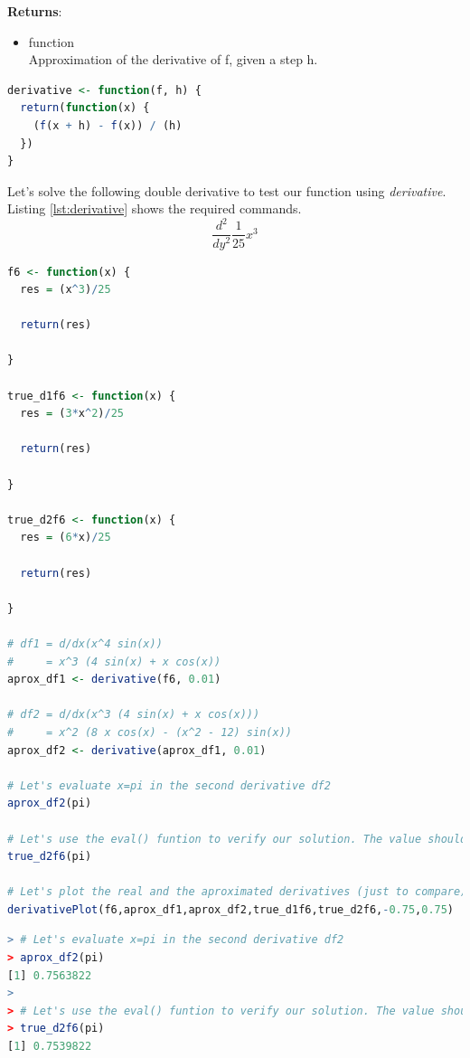 \documentclass[11pt,a4paper]{article}
\begin{document}
\textbf{Returns}:
\begin{itemize}
  \item {function\\
Approximation of the derivative of f, given a step h.}
\end{itemize}

\clearpage

\begin{lstlisting}[frame=trBL, language=R, caption="The \emph{derivative} function"
\label{lst:derivativeFunct}]
derivative <- function(f, h) {
  return(function(x) {
    (f(x + h) - f(x)) / (h)
  })
}
\end{lstlisting}

Let's solve the following double derivative to test our function using \emph{derivative}. Listing \ref{lst:derivative} shows the required commands.
$$ \frac{d^2}{d y^2} \frac{1}{25} x^3 $$

\begin{lstlisting}[frame=trBL, language=R, caption="Define the function and implement \emph{derivative}"
\label{lst:derivative}]
f6 <- function(x) {
  res = (x^3)/25
  
  return(res)
  
}

true_d1f6 <- function(x) {
  res = (3*x^2)/25
  
  return(res)
  
}

true_d2f6 <- function(x) {
  res = (6*x)/25
  
  return(res)
  
}

# df1 = d/dx(x^4 sin(x))
#     = x^3 (4 sin(x) + x cos(x))
aprox_df1 <- derivative(f6, 0.01)

# df2 = d/dx(x^3 (4 sin(x) + x cos(x)))
#     = x^2 (8 x cos(x) - (x^2 - 12) sin(x))
aprox_df2 <- derivative(aprox_df1, 0.01)

# Let's evaluate x=pi in the second derivative df2
aprox_df2(pi)

# Let's use the eval() funtion to verify our solution. The value should be around df2(pi)
true_d2f6(pi)

# Let's plot the real and the aproximated derivatives (just to compare)
derivativePlot(f6,aprox_df1,aprox_df2,true_d1f6,true_d2f6,-0.75,0.75)
\end{lstlisting}

\clearpage

\begin{lstlisting}[frame=trBL, language=R, caption="Listing \ref{lst:derivative} output"
\label{lst:derivative_out}]
> # Let's evaluate x=pi in the second derivative df2
> aprox_df2(pi)
[1] 0.7563822
> 
> # Let's use the eval() funtion to verify our solution. The value should be around df2(pi)
> true_d2f6(pi)
[1] 0.7539822
\end{lstlisting}
\end{document}
